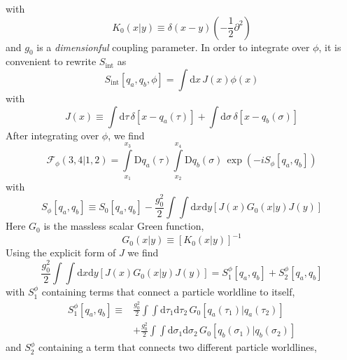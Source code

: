 with
\begin{equation}
	K_{0}(x | y) \equiv \delta(x - y) \left( - \frac{1}{2} \partial^{2} \right)
\end{equation}
and $g_{0}$ is a \textit{dimensionful} coupling parameter. In order to integrate over $\phi$, it is convenient to rewrite $S_{\text{int}}$ as
\begin{equation}
	S_{\text{int}}[q_{a}, q_{b}, \phi] = \int \mathrm{d}x \, J(x) \phi(x)
\end{equation}
with
\begin{equation}
	J(x) \equiv \int \mathrm{d}\tau \, \delta[x - q_{a}(\tau)] + \int \mathrm{d}\sigma \, \delta[x - q_{b}(\sigma)]
\end{equation}
After integrating over $\phi$, we find
\begin{equation}
	\mathcal{F}_{\phi}(3,4|1,2) = \int\limits_{x_{1}}^{x_{3}} \mathrm{D}q_{a}(\tau) \int\limits_{x_{2}}^{x_{4}} \mathrm{D}q_{b}(\sigma) \, \exp{\left(- i S_{\phi}[q_{a}, q_{b}] \right)}
\end{equation}
with
\begin{equation}
	S_{\phi}[q_{a}, q_{b}] \equiv S_{0}[q_{a}, q_{b}] - \frac{g_{0}^{2}}{2} \int \int \mathrm{d}x \mathrm{d}y \left[ J(x) G_{0}(x | y) J(y) \right] \label{SPhiJGJ}
\end{equation}
Here $G_{0}$ is the massless scalar Green function,
\begin{equation}
	G_{0}(x|y) \equiv [K_{0}(x|y)]^{-1}
\end{equation}
Using the explicit form of $J$ we find
\begin{equation}
	\frac{g_{0}^{2}}{2} \int \int \mathrm{d}x \mathrm{d}y \left[ J(x) G_{0}(x | y) J(y) \right] = S_{1}^{\phi}[q_{a}, q_{b}] + S_{2}^{\phi}[q_{a}, q_{b}] \label{JGJSca}
\end{equation}
with $S_{1}^{\phi}$ containing terms that connect a particle worldline to itself,
\begin{equation}
\begin{split}
	S_{1}^{\phi}[q_{a}, q_{b}] \equiv {}& \frac{g_{0}^{2}}{2} \int \int \mathrm{d}\tau_{1} \mathrm{d}\tau_{2} \, G_{0}\left[ q_{a}(\tau_{1}) | q_{a}(\tau_{2}) \right] \\
	&+ \frac{g_{0}^{2}}{2} \int \int \mathrm{d}\sigma_{1} \mathrm{d}\sigma_{2} \, G_{0}\left[ q_{b}(\sigma_{1}) | q_{b}(\sigma_{2}) \right]
\end{split}
\end{equation}
and $S_{2}^{\phi}$ containing a term that connects two different particle worldlines,
